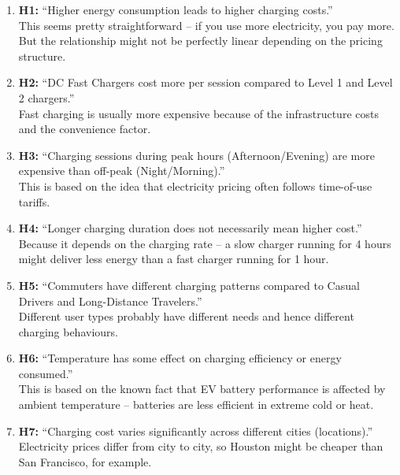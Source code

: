 \documentclass[12pt, a4paper]{article}
\begin{document}
\begin{enumerate}
    \item \textbf{H1:} ``Higher energy consumption leads to higher charging costs.'' \\
    This seems pretty straightforward -- if you use more electricity, you pay more. But the relationship might not be perfectly linear depending on the pricing structure.

    \item \textbf{H2:} ``DC Fast Chargers cost more per session compared to Level 1 and Level 2 chargers.'' \\
    Fast charging is usually more expensive because of the infrastructure costs and the convenience factor.

    \item \textbf{H3:} ``Charging sessions during peak hours (Afternoon/Evening) are more expensive than off-peak (Night/Morning).'' \\
    This is based on the idea that electricity pricing often follows time-of-use tariffs.

    \item \textbf{H4:} ``Longer charging duration does not necessarily mean higher cost.'' \\
    Because it depends on the charging rate -- a slow charger running for 4 hours might deliver less energy than a fast charger running for 1 hour.

    \item \textbf{H5:} ``Commuters have different charging patterns compared to Casual Drivers and Long-Distance Travelers.'' \\
    Different user types probably have different needs and hence different charging behaviours.

    \item \textbf{H6:} ``Temperature has some effect on charging efficiency or energy consumed.'' \\
    This is based on the known fact that EV battery performance is affected by ambient temperature -- batteries are less efficient in extreme cold or heat.

    \item \textbf{H7:} ``Charging cost varies significantly across different cities (locations).'' \\
    Electricity prices differ from city to city, so Houston might be cheaper than San Francisco, for example.
\end{enumerate}
\end{document}

